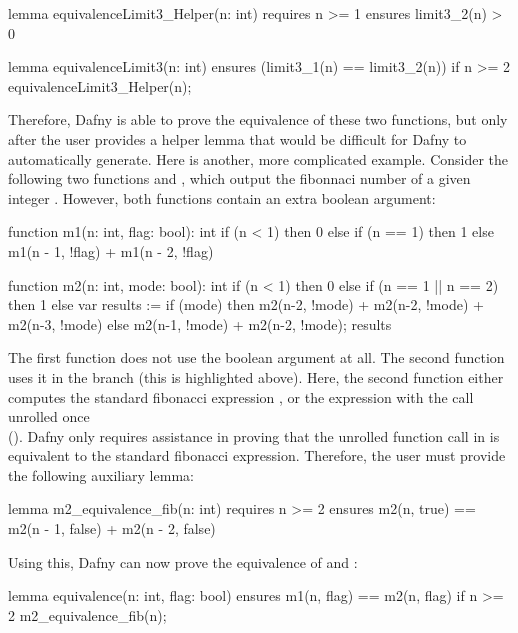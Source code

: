 \begin{dafny}
lemma equivalenceLimit3_Helper(n: int)
  requires n >= 1
  ensures limit3_2(n) > 0
{}

lemma equivalenceLimit3(n: int)
  ensures (limit3_1(n) == limit3_2(n))
{
  if n >= 2 { equivalenceLimit3_Helper(n); }
}
\end{dafny}
%
Therefore, Dafny is able to prove the equivalence of these two functions, but only after the user provides a helper lemma that would be difficult for Dafny to automatically generate. Here is another, more complicated example. Consider the following two functions  and , which output the fibonnaci number of a given integer . However, both functions contain an extra boolean argument: 
\begin{dafny}[highlightlines=11-15]
function m1(n: int, flag: bool): int {
  if (n < 1) then 0
  else if (n == 1) then 1
  else m1(n - 1, !flag) + m1(n - 2, !flag)
}

function m2(n: int, mode: bool): int {
  if (n < 1) then 0
  else if (n == 1 || n == 2) then 1
  else
    var results := if (mode) then
                      m2(n-2, !mode) + m2(n-2, !mode) + m2(n-3, !mode) 
                   else
                      m2(n-1, !mode) + m2(n-2, !mode);
    results
}
\end{dafny}
%
The first function does not use the boolean argument at all. The second function uses it in the  branch (this is highlighted above). Here, the second function either computes the standard fibonacci expression , or the expression with the  call unrolled once \\(). Dafny only requires assistance in proving that the unrolled function call in  is equivalent to the standard fibonacci expression. Therefore, the user must provide the following auxiliary lemma:

\begin{dafny}
lemma m2_equivalence_fib(n: int)
  requires n >= 2
  ensures m2(n, true) == m2(n - 1, false) + m2(n - 2, false)
{}
\end{dafny}
%
Using this, Dafny can now prove the equivalence of  and :
\begin{dafny}
lemma equivalence(n: int, flag: bool)
  ensures m1(n, flag) == m2(n, flag)
{
  if n >= 2 { m2_equivalence_fib(n); }
}
\end{dafny}

